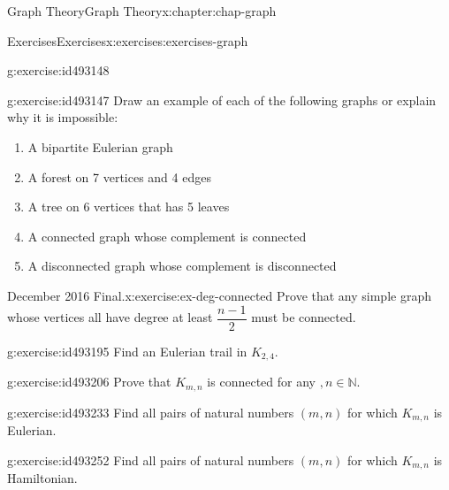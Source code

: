 \documentclass[oneside,10pt,]{book}
\numberwithin{equation}{section}
\begin{document}
\begin{chapterptx}{Graph Theory}{}{Graph Theory}{}{}{x:chapter:chap-graph}
\begin{exercises-section}{Exercises}{}{Exercises}{}{}{x:exercises:exercises-graph}
\begin{divisionexercise}{25}{}{}{g:exercise:id493148}
\begin{sidebyside}{1}{0.38}{0.38}{0}
\begin{sbspanel}{0.24}
{
}%
\end{sbspanel}%
\end{sidebyside}%
\end{divisionexercise}%
\begin{divisionexercise}{26}{}{}{g:exercise:id493147}%
Draw an example of each of the following graphs or explain why it is impossible:%
\begin{enumerate}[label=(\alph*)]
\item{}A bipartite Eulerian graph%
\item{}A forest on 7 vertices and 4 edges%
\item{}A tree on 6 vertices that has 5 leaves%
\item{}A connected graph whose complement is connected%
\item{}A disconnected graph whose complement is disconnected%
\end{enumerate}
%
\end{divisionexercise}%
\begin{divisionexercise}{27}{December 2016 Final.}{}{x:exercise:ex-deg-connected}%
Prove that any simple graph whose vertices all have degree at least \(\dfrac{n-1}{2}\) must be connected.%
\end{divisionexercise}%
\begin{divisionexercise}{28}{}{}{g:exercise:id493195}%
Find an Eulerian trail in \(K_{2,4}\).%
\end{divisionexercise}%
\begin{divisionexercise}{29}{}{}{g:exercise:id493206}%
Prove that \(K_{m,n}\) is connected for any \(,n \in \mathbb{N}\).%
\end{divisionexercise}%
\begin{divisionexercise}{30}{}{}{g:exercise:id493233}%
Find all pairs of natural numbers \((m,n)\) for which \(K_{m,n}\) is Eulerian.%
\end{divisionexercise}%
\begin{divisionexercise}{31}{}{}{g:exercise:id493252}%
Find all pairs of natural numbers \((m,n)\) for which \(K_{m,n}\) is Hamiltonian.%
\end{divisionexercise}%

\end{exercises-section}
\end{chapterptx}
\end{document}
